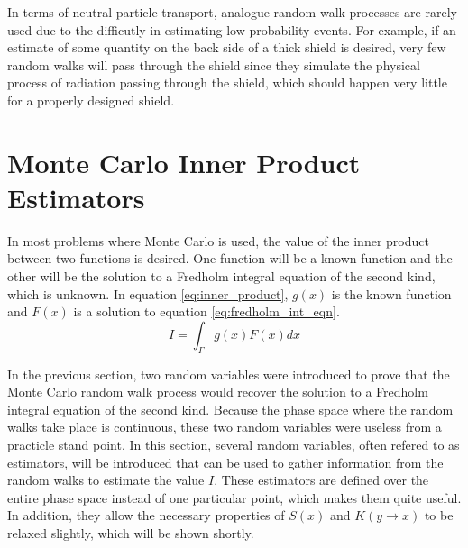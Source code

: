 In terms of neutral particle transport, analogue random walk processes are 
rarely used due to the difficutly in estimating low probability events. For
example, if an estimate of some quantity on the back side of a thick shield is 
desired, very few random walks will pass through the shield since they simulate
the physical process of radiation passing through the shield, which should
happen very little for a properly designed shield.

\section{Monte Carlo Inner Product Estimators}
\label{sec:mc_int_eqn_estimators}
In most problems where Monte Carlo is used, the value of the inner product
between two functions is desired. One function will be a known function and
the other will be the solution to a Fredholm integral equation of the second
kind, which is unknown. In equation \ref{eq:inner_product}, $g(x)$ is the known
function and $F(x)$ is a solution to equation \ref{eq:fredholm_int_eqn}.
\begin{equation}
  I = \int_{\Gamma} g(x)F(x)dx
  \label{eq:inner_product}
\end{equation}

In the previous section, two random variables were introduced to prove that
the Monte Carlo random walk process would recover the solution to a Fredholm
integral equation of the second kind. Because the phase space where the random
walks take place is continuous, these two random variables were useless from
a practicle stand point. In this section, several random variables, often 
refered to as estimators, will be introduced that can be used to gather 
information from the random walks to estimate the value $I$. These estimators
are defined over the entire phase space instead of one particular point, 
which makes them quite useful. In addition, they allow the necessary properties
of $S(x)$ and $K(y \to x)$ to be relaxed slightly, which will be shown shortly.

